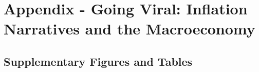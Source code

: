 \clearpage
\appendix
{}  %
\setcounter{page}{1}   %
\newpage
{} %

\section{Appendix - Going Viral: Inflation Narratives and the Macroeconomy}\label{sec:Appendix}

\subsection{Supplementary Figures and Tables}\label{subsec:Supplements}

